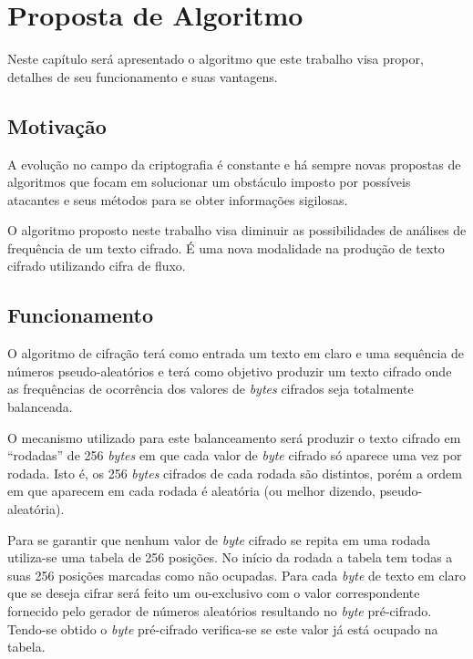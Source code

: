 \chapter{Proposta de Algoritmo}
\label{algorithm-proposition}

Neste capítulo será apresentado o algoritmo que este trabalho visa propor, detalhes de seu funcionamento e suas vantagens.

\section{Motivação}
\label{motivation}

A evolução no campo da criptografia é constante e há sempre novas propostas de algoritmos que focam em solucionar um obstáculo imposto por possíveis atacantes e seus métodos para se obter informações sigilosas.

O algoritmo proposto neste trabalho visa diminuir as possibilidades de análises de frequência de um texto cifrado. É uma nova modalidade na produção de texto cifrado utilizando cifra de fluxo. 


\section{Funcionamento}
\label{functioning}

O algoritmo de cifração terá como entrada um texto em claro e uma sequência de números pseudo-aleatórios e terá como objetivo produzir um texto cifrado onde as frequências de ocorrência dos valores de \textit{bytes} cifrados seja totalmente balanceada.

O mecanismo utilizado para este balanceamento será produzir o texto cifrado em “rodadas” de 256 \textit{bytes} em que cada valor de \textit{byte} cifrado só aparece uma vez por rodada. Isto é, os 256  \textit{bytes} cifrados de cada rodada são distintos, porém a ordem em que aparecem em cada rodada é aleatória (ou melhor dizendo, pseudo-aleatória).

Para se garantir que nenhum valor de \textit{byte} cifrado se repita em uma rodada utiliza-se uma tabela de 256 posições. No início da rodada a tabela tem todas a suas 256 posições marcadas como não ocupadas. Para cada \textit{byte} de texto em claro que se deseja cifrar será feito um ou-exclusivo com o valor correspondente fornecido pelo gerador de números aleatórios resultando no \textit{byte} pré-cifrado. Tendo-se obtido o \textit{byte} pré-cifrado verifica-se se este valor já está ocupado na tabela. 

